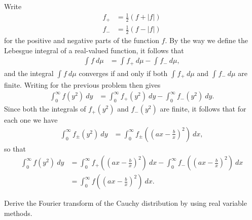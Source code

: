 \documentclass[10pt]{mypackage}
\begin{document}
\begin{solution}
  Write
  \begin{align*}
    f_{+} &= \frac{1}{2}\left( f + \left\vert f \right\vert \right)\\
    f_{-} &= \frac{1}{2}\left( f-\left\vert f \right\vert \right)
  \end{align*}
  for the positive and negative parts of the function $f$. By the way we define the Lebesgue integral of a real-valued function, it follows that
  \begin{align*}
    \int_{}^{} f\:d\mu &= \int_{}^{} f_{+}\:d\mu - \int_{}^{} f_{-}\:d\mu,
  \end{align*}
  and the integral $ \int_{}^{} f\:d\mu $ converges if and only if both $ \int_{}^{} f_{+}\:d\mu $ and $ \int_{}^{} f_{-}\:d\mu $ are finite. Writing for the previous problem then gives
  \begin{align*}
    \int_{0}^{\infty} f\left( y^2 \right)\:dy &= \int_{0}^{\infty} f_{+}\left( y^2 \right)\:dy - \int_{0}^{\infty} f_{-}\left( y^2 \right)\:dy.
  \end{align*}
  Since both the integrals of $f_{+}(y^2)$ and $f_{-}(y^2)$ are finite, it follows that for each one we have
  \begin{align*}
    \int_{0}^{\infty} f_{\pm}\left( y^2 \right)\:dy &= \int_{0}^{\infty} f_{\pm}\left( \left( ax-\frac{b}{x} \right)^2 \right)\:dx,
  \end{align*}
  so that
  \begin{align*}
    \int_{0}^{\infty} f(y^2)\:dy &= \int_{0}^{\infty} f_{+}\left( \left( ax - \frac{b}{x} \right)^2 \right)\:dx - \int_{0}^{\infty} f_{-}\left( \left( ax - \frac{b}{x} \right)^2 \right)\:dx\\
                                 &= \int_{0}^{\infty} f\left( \left( ax - \frac{b}{x} \right)^2 \right)\:dx.
  \end{align*}
\end{solution}
\begin{problem}[Problem I.10]
  Derive the Fourier transform of the Cauchy distribution by using real variable methods.
\end{problem}
\end{document}
